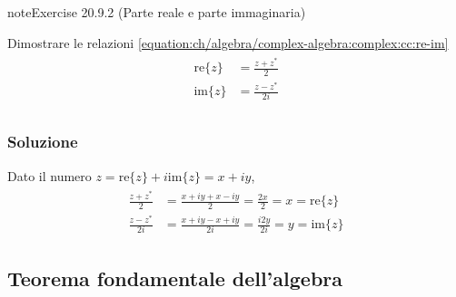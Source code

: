\documentclass[letterpaper,10pt,italian]{jupyterBook}
\begin{document}
\begin{sphinxadmonition}{note}{Exercise 20.9.2 (Parte reale e parte immaginaria)}



\sphinxAtStartPar
Dimostrare le relazioni \eqref{equation:ch/algebra/complex-algebra:complex:cc:re-im}
\begin{equation*}
\begin{split}\begin{aligned}
  \text{re}\{z\} & = \frac{z + z^*}{2} \\
  \text{im}\{z\} & = \frac{z - z^*}{2i} \\
\end{aligned}\end{split}
\end{equation*}\subsubsection*{Soluzione}

\sphinxAtStartPar
Dato il numero \(z = \text{re}\{z\} + i \text{im}\{z\} = x + i y\),
\begin{equation*}
\begin{split}\begin{aligned}
 \frac{z + z^*}{2}  & = \frac{x+iy+x-iy}{2}  = \frac{2x}{2} = x = \text{re}\{z\} \\
 \frac{z - z^*}{2i} & = \frac{x+iy-x+iy}{2i} = \frac{i2y}{2i} = y = \text{im}\{z\}
\end{aligned}\end{split}
\end{equation*}\end{sphinxadmonition}


\subsection{Teorema fondamentale dell’algebra}
\label{\detokenize{ch/algebra/complex-algebra-problems:teorema-fondamentale-dell-algebra}}\label{\detokenize{ch/algebra/complex-algebra-problems:math-hs-algebra-complex-fund-thm}} \label{exercise:ch/algebra/complex-algebra-problems-exercise-2}
\end{document}
